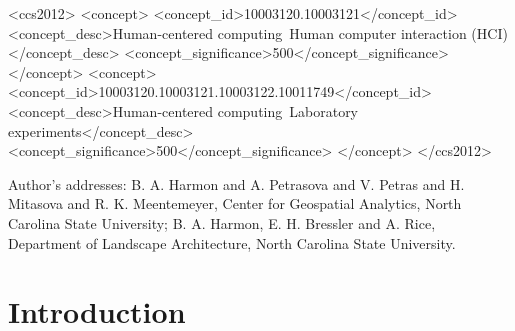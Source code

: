 \documentclass[prodmode,acmtochi]{acmsmall} %
\begin{document}
%
%
\begin{CCSXML}
<ccs2012>
<concept>
<concept_id>10003120.10003121</concept_id>
<concept_desc>Human-centered computing~Human computer interaction (HCI)</concept_desc>
<concept_significance>500</concept_significance>
</concept>
<concept>
<concept_id>10003120.10003121.10003122.10011749</concept_id>
<concept_desc>Human-centered computing~Laboratory experiments</concept_desc>
<concept_significance>500</concept_significance>
</concept>
</ccs2012>
\end{CCSXML}

%
%



\begin{bottomstuff}
Author's addresses: B. A. Harmon {and} A. Petrasova {and} V. Petras {and} H. Mitasova {and} R. K. Meentemeyer, Center for Geospatial Analytics, North Carolina State University; B. A. Harmon, E. H. Bressler {and} A. Rice, Department of Landscape Architecture, North Carolina State University.
\end{bottomstuff}


\maketitle


\section{Introduction}
\end{document}
